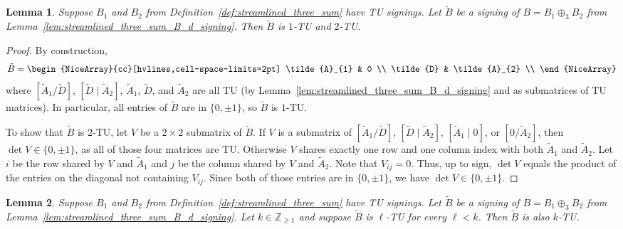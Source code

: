 \documentclass{article}
\newtheorem{lemma}{Lemma}
\theoremstyle{definition}
\begin{document}
\begin{lemma}\label{lem:streamlined_three_sum_1_2_TU}
    Suppose $B_{1}$ and $B_{2}$ from Definition~\ref{def:streamlined_three_sum} have TU signings. Let $\tilde{B}$ be a signing of $B = B_{1} \oplus_{3} B_{2}$ from Lemma~\ref{lem:streamlined_three_sum_B_d_signing}. Then $\tilde{B}$ is $1$-TU and $2$-TU.
\end{lemma}

\begin{proof}
    By construction,
    \[
        \tilde{B} = \begin{NiceArray}{cc}[hvlines,cell-space-limits=2pt]
            \tilde{A}_{1} & 0 \\
            \tilde{D} & \tilde{A}_{2} \\
        \end{NiceArray}
    \]
    where $[\tilde{A}_{1} / \tilde{D}]$, $[\tilde{D} \mid \tilde{A}_{2}]$, $\tilde{A}_{1}$, $\tilde{D}$, and $\tilde{A}_{2}$ are all TU (by Lemma~\ref{lem:streamlined_three_sum_B_d_signing} and as submatrices of TU matrices). In particular, all entries of $\tilde{B}$ are in $\{0, \pm 1\}$, so $\tilde{B}$ is $1$-TU.

    To show that $\tilde{B}$ is $2$-TU, let $V$ be a $2 \times 2$ submatrix of $\tilde{B}$. If $V$ is a submatrix of $[\tilde{A}_{1} / \tilde{D}]$, $[\tilde{D} \mid \tilde{A}_{2}]$, $[\tilde{A}_{1} \mid 0]$, or $[0 / \tilde{A}_{2}]$, then $\det V \in \{0, \pm 1\}$, as all of those four matrices are TU. Otherwise $V$ shares exactly one row and one column index with both $\tilde{A}_{1}$ and $\tilde{A}_{2}$. Let $i$ be the row shared by $V$ and $\tilde{A}_{1}$ and $j$ be the column shared by $V$ and $\tilde{A}_{2}$. Note that $V_{ij} = 0$. Thus, up to sign, $\det V$ equals the product of the entries on the diagonal not containing $V_{ij}$. Since both of those entries are in $\{0, \pm 1\}$, we have $\det V \in \{0, \pm 1\}$.
\end{proof}

\begin{lemma}\label{lem:streamlined_three_sum_k_TU_induction}
    Suppose $B_{1}$ and $B_{2}$ from Definition~\ref{def:streamlined_three_sum} have TU signings. Let $\tilde{B}$ be a signing of $B = B_{1} \oplus_{3} B_{2}$ from Lemma~\ref{lem:streamlined_three_sum_B_d_signing}. Let $k \in \mathbb{Z}_{\geq 1}$ and suppose $\tilde{B}$ is $\ell$-TU for every $\ell < k$. Then $\tilde{B}$ is also $k$-TU.
\end{lemma}
\end{document}
